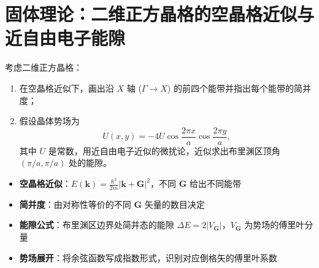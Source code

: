 \section{固体理论：二维正方晶格的空晶格近似与近自由电子能隙}
\label{sec:2d-square-nearly-free}

\begin{modelbox}[题目：二维正方晶格的能带与布里渊区顶角能隙]
考虑二维正方晶格：
\begin{enumerate}
    \item 在空晶格近似下，画出沿 $X$ 轴 ($\Gamma\to X$) 的前四个能带并指出每个能带的简并度；
    \item 假设晶体势场为
    \begin{equation}
    U(x,y)=-4U\cos\frac{2\pi x}{a}\cos\frac{2\pi y}{a},
    \end{equation}
    其中 $U$ 是常数，用近自由电子近似的微扰论，近似求出布里渊区顶角 $(\pi/a,\pi/a)$ 处的能隙。
\end{enumerate}
\end{modelbox}

\begin{tipbox}[考点快速分析]
\begin{itemize}
    \item \textbf{空晶格近似}：$E(\bm{k})=\frac{\hbar^2}{2m}|\bm{k}+\bm{G}|^2$，不同 $\bm{G}$ 给出不同能带
    \item \textbf{简并度}：由对称性等价的不同 $\bm{G}$ 矢量的数目决定
    \item \textbf{能隙公式}：布里渊区边界处简并态的能隙 $\Delta E=2|V_{\bm{G}}|$，$V_{\bm{G}}$ 为势场的傅里叶分量
    \item \textbf{势场展开}：将余弦函数写成指数形式，识别对应倒格矢的傅里叶系数
\end{itemize}
\end{tipbox}

